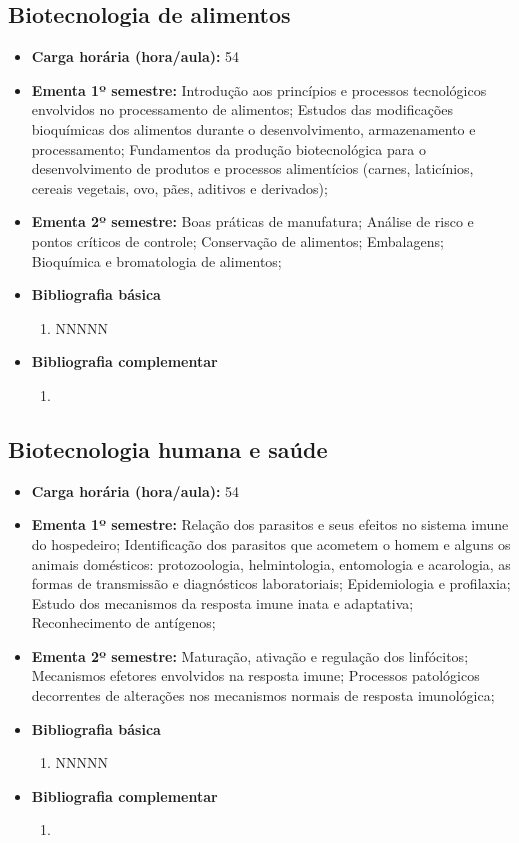 \documentclass[11pt,fleqn]{book} %
\begin{document}
\subsection{Biotecnologia de alimentos}\label{disc:biotecAlimentos}
\begin{itemize}
	\item \textbf{Carga horária (hora/aula):} 54
	\item \textbf{Ementa 1º semestre:}	
	Introdução aos princípios e processos tecnológicos envolvidos no processamento de alimentos;
	Estudos das modificações bioquímicas dos alimentos durante o desenvolvimento, armazenamento e processamento;
	Fundamentos da produção biotecnológica para o desenvolvimento de produtos e processos alimentícios (carnes, laticínios, cereais vegetais, ovo, pães, aditivos e derivados);
	\item \textbf{Ementa 2º semestre:}	
	Boas práticas de manufatura;
	Análise de risco e pontos críticos de controle;
	Conservação de alimentos;
	Embalagens;
	Bioquímica e bromatologia de alimentos;
	\item \textbf{Bibliografia básica}
	\begin{enumerate}
		\item NNNNN
	\end{enumerate}
	\item \textbf{Bibliografia complementar}
	\begin{enumerate}
		\item 
	\end{enumerate}	
\end{itemize}

\newpage
\subsection{Biotecnologia humana e saúde}\label{disc:biotecSaude}
\begin{itemize}
	\item \textbf{Carga horária (hora/aula):} 54
	\item \textbf{Ementa 1º semestre:}	
	Relação dos parasitos e seus efeitos no sistema imune do hospedeiro; 
	Identificação dos parasitos que acometem o homem e alguns os animais domésticos: protozoologia, helmintologia, entomologia e acarologia, as formas de transmissão e diagnósticos laboratoriais; 
	Epidemiologia e profilaxia; 
	Estudo dos mecanismos da resposta imune inata e adaptativa; 
	Reconhecimento de antígenos; 
	\item \textbf{Ementa 2º semestre:}		
	Maturação, ativação e regulação dos linfócitos;
	Mecanismos efetores envolvidos na resposta imune;
	Processos patológicos decorrentes de alterações nos mecanismos normais de resposta imunológica;
	\item \textbf{Bibliografia básica}
	\begin{enumerate}
		\item NNNNN
	\end{enumerate}
	\item \textbf{Bibliografia complementar}
	\begin{enumerate}
		\item 
	\end{enumerate}	
\end{itemize}
\end{document}
